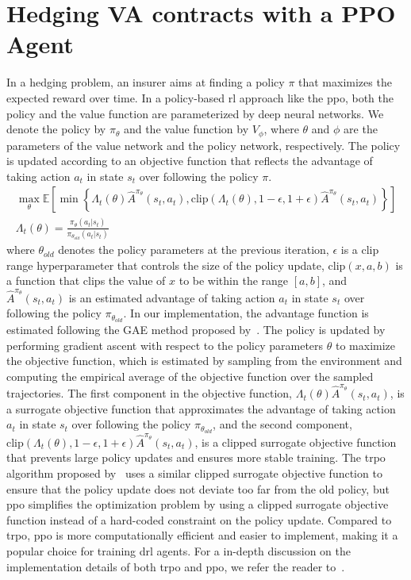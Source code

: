 \section{Hedging VA contracts with a PPO Agent} \label{sec:PPO}
In a hedging problem, an insurer aims at finding a policy $\pi$ that maximizes the expected reward over time.
In a policy-based \gls{rl} approach like the \gls{ppo}, both the policy and the value function are parameterized by deep neural networks.
We denote the policy by $\pi_{\theta}$ and the value function by $V_{\phi}$, where $\theta$ and $\phi$ are the parameters of the value network and the policy network, respectively.
The policy is updated according to an objective function that reflects the advantage of taking action $a_t$ in state $s_t$ over following the policy $\pi$.
\begin{align}
    \max_{\theta} \mathbb{E}\left[ \min \left\{ \Lambda_t(\theta)\hat{A}^{\pi_{\theta}}(s_t, a_t), \text{clip}(\Lambda_t(\theta), 1-\epsilon, 1 + \epsilon) \hat{A}^{\pi_{\theta}}(s_t, a_t)  \right\} \right] \\
    \Lambda_t(\theta) = \frac{\pi_{\theta}(a_t|s_t)}{\pi_{\theta_{old}}(a_t|s_t)} 
\end{align}
where $\theta_{old}$ denotes the policy parameters at the previous iteration, $\epsilon$ is a clip range hyperparameter that controls the size of the policy update, $\text{clip}(x, a, b)$ is a function that clips the value of $x$ to be within the range $[a, b]$, and $\hat{A}^{\pi_{\theta}}(s_t, a_t)$ is an estimated advantage of taking action $a_t$ in state $s_t$ over following the policy $\pi_{\theta_{old}}$.
In our implementation, the advantage function is estimated following the GAE method proposed by~\cite{schulman2015high}.
The policy is updated by performing gradient ascent with respect to the policy parameters $\theta$ to maximize the objective function, which is estimated by sampling from the environment and computing the empirical average of the objective function over the sampled trajectories.
The first component in the objective function, $\Lambda_t(\theta) \hat{A}^{\pi_{\theta}}(s_t, a_t)$, is a surrogate objective function that approximates the advantage of taking action $a_t$ in state $s_t$ over following the policy $\pi_{\theta_{old}}$, and the second component, $\text{clip}(\Lambda_t(\theta), 1-\epsilon, 1 + \epsilon) \hat{A}^{\pi_{\theta}}(s_t, a_t)$, is a clipped surrogate objective function that prevents large policy updates and ensures more stable training.
The \gls{trpo} algorithm proposed by~\cite{schulman2015trust} uses a similar clipped surrogate objective function to ensure that the policy update does not deviate too far from the old policy, but \gls{ppo} simplifies the optimization problem by using a clipped surrogate objective function instead of a hard-coded constraint on the policy update.
Compared to \gls{trpo}, \gls{ppo} is more computationally efficient and easier to implement, making it a popular choice for training \gls{drl} agents.
For a in-depth discussion on the implementation details of both \gls{trpo} and \gls{ppo}, we refer the reader to~\cite{engstrom2020implementation}.

